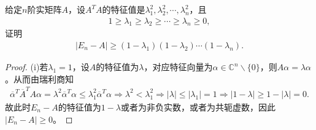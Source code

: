 \documentclass[../../main.tex]{subfiles}%
\begin{document}
\begin{example}
给定$n$阶实矩阵$A$，设$A^T A$的特征值是$\lambda_1^2,\lambda_2^2,\cdots,\lambda_n^2$，且
\begin{align*}
1 \geqslant \lambda_1 \geqslant \lambda_2 \geqslant \cdots \geqslant \lambda_n \geqslant 0,
\end{align*}
证明
\begin{align*}
|E_n - A| \geqslant (1 - \lambda_1)(1 - \lambda_2)\cdots(1 - \lambda_n).
\end{align*}
\end{example}
\begin{proof}

(i)若$\lambda_1=1$，设$A$的特征值为$\lambda$，对应特征向量为$\alpha \in \mathbb{C}^n\backslash \{0\}$，则$A\alpha=\lambda \alpha$。从而由瑞利商知
\begin{align*}
\overline{\alpha}^T\overline{A}^TA\alpha=\lambda^2\overline{\alpha}^T\alpha \leqslant \lambda_1^2\overline{\alpha}^T\alpha \Longrightarrow \lambda^2<\lambda_1^2
\Longrightarrow |\lambda| \leqslant |\lambda_1|=1 \Longrightarrow |1-\lambda| \geqslant 1-|\lambda|=0.
\end{align*}
故此时$E_n-A$的特征值为$1-\lambda$或者为非负实数，或者为共轭虚数，因此$|E_n-A| \geqslant 0$。


\end{proof}
\end{document}
